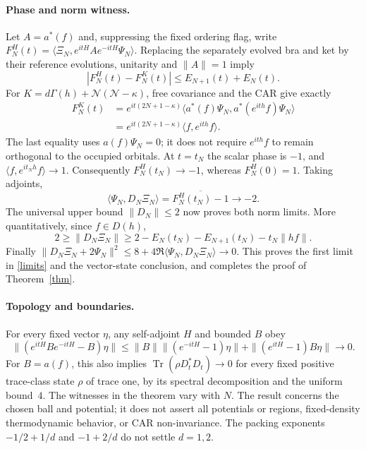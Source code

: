 \documentclass[11pt]{article}
\newcommand{\N}{\mathcal N}
\newcommand{\Tr}{\operatorname{Tr}}
\begin{document}
\paragraph{Phase and norm witness.}
Let $A=a^*(f)$ and, suppressing the fixed ordering flag, write
$F_N^H(t)=\langle\Xi_N,e^{itH}Ae^{-itH}\Psi_N\rangle$.
Replacing the separately evolved bra and ket by their reference evolutions,
unitarity and $\|A\|=1$ imply
\begin{equation}\label{Fbound}
 |F_N^H(t)-F_N^K(t)|\leq E_{N+1}(t)+E_N(t).
\end{equation}
For $K=d\Gamma(h)+\N(\N-\kappa)$, free covariance and the CAR give exactly
\begin{align}
 F_N^K(t)&=e^{it(2N+1-\kappa)}
 \langle a^*(f)\Psi_N,a^*(e^{ith}f)\Psi_N\rangle\nonumber\\
 &=e^{it(2N+1-\kappa)}\langle f,e^{ith}f\rangle .\label{phase}
\end{align}
The last equality uses $a(f)\Psi_N=0$; it does not require $e^{ith}f$ to
remain orthogonal to the occupied orbitals. At $t=t_N$ the scalar phase is
$-1$, and $\langle f,e^{it_Nh}f\rangle\to1$. Consequently
$F_N^H(t_N)\to-1$, whereas $F_N^H(0)=1$. Taking adjoints,
\[
 \langle\Psi_N,D_N\Xi_N\rangle
 =\overline{F_N^H(t_N)-1}\longrightarrow-2 .
\]
The universal upper bound $\|D_N\|\leq2$ now proves both norm limits.
More quantitatively, since $f\in D(h)$,
\[
 2\geq\|D_N\Xi_N\|\geq
 2-E_N(t_N)-E_{N+1}(t_N)-t_N\|hf\|.
\]
Finally
$\|D_N\Xi_N+2\Psi_N\|^2
 \leq8+4\Re\langle\Psi_N,D_N\Xi_N\rangle\to0$.
This proves the first limit in \eqref{limits} and the vector-state conclusion,
and completes the proof of Theorem~\ref{thm}.

\paragraph{Topology and boundaries.}
For every fixed vector $\eta$, any self-adjoint $H$ and bounded $B$ obey
\[
 \|(e^{itH}Be^{-itH}-B)\eta\|
 \leq\|B\|\|(e^{-itH}-1)\eta\|+\|(e^{itH}-1)B\eta\|\to0.
\]
For $B=a(f)$, this also implies
$\Tr(\rho D_t^*D_t)\to0$ for every fixed positive trace-class state
$\rho$ of trace one, by its spectral decomposition and the uniform bound~$4$.
The witnesses in the theorem vary with $N$. The result concerns the chosen
ball and potential; it does not assert all potentials or regions,
fixed-density thermodynamic behavior, or CAR non-invariance. The packing
exponents $-1/2+1/d$ and $-1+2/d$ do not settle $d=1,2$.
\end{document}
